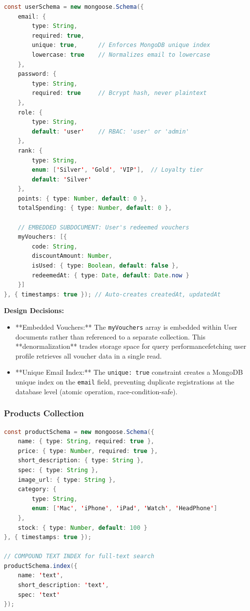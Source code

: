 \documentclass[12pt, a4paper]{report}
\begin{document}
\begin{lstlisting}[language=Java, caption=User Schema (server.js:91-101)]
const userSchema = new mongoose.Schema({
    email: { 
        type: String, 
        required: true, 
        unique: true,      // Enforces MongoDB unique index
        lowercase: true    // Normalizes email to lowercase
    },
    password: { 
        type: String, 
        required: true     // Bcrypt hash, never plaintext
    },
    role: { 
        type: String, 
        default: 'user'    // RBAC: 'user' or 'admin'
    },
    rank: { 
        type: String, 
        enum: ['Silver', 'Gold', 'VIP'],  // Loyalty tier
        default: 'Silver' 
    },
    points: { type: Number, default: 0 },
    totalSpending: { type: Number, default: 0 },
    
    // EMBEDDED SUBDOCUMENT: User's redeemed vouchers
    myVouchers: [{
        code: String,
        discountAmount: Number,
        isUsed: { type: Boolean, default: false },
        redeemedAt: { type: Date, default: Date.now }
    }]
}, { timestamps: true }); // Auto-creates createdAt, updatedAt
\end{lstlisting}

\textbf{Design Decisions:}
\begin{itemize}
    \item **Embedded Vouchers:** The \texttt{myVouchers} array is embedded within User documents rather than referenced to a separate collection. This **denormalization** trades storage space for query performancefetching user profile retrieves all voucher data in a single read.
    \item **Unique Email Index:** The \texttt{unique: true} constraint creates a MongoDB unique index on the \texttt{email} field, preventing duplicate registrations at the database level (atomic operation, race-condition-safe).
\end{itemize}

\subsubsection{Products Collection}

\begin{lstlisting}[language=Java, caption=Product Schema (model/Product.js)]
const productSchema = new mongoose.Schema({
    name: { type: String, required: true },
    price: { type: Number, required: true },
    short_description: { type: String },
    spec: { type: String },
    image_url: { type: String },
    category: { 
        type: String,
        enum: ['Mac', 'iPhone', 'iPad', 'Watch', 'HeadPhone'] 
    },
    stock: { type: Number, default: 100 }
}, { timestamps: true });

// COMPOUND TEXT INDEX for full-text search
productSchema.index({
    name: 'text',
    short_description: 'text',
    spec: 'text'
});
\end{lstlisting}
\end{document}
